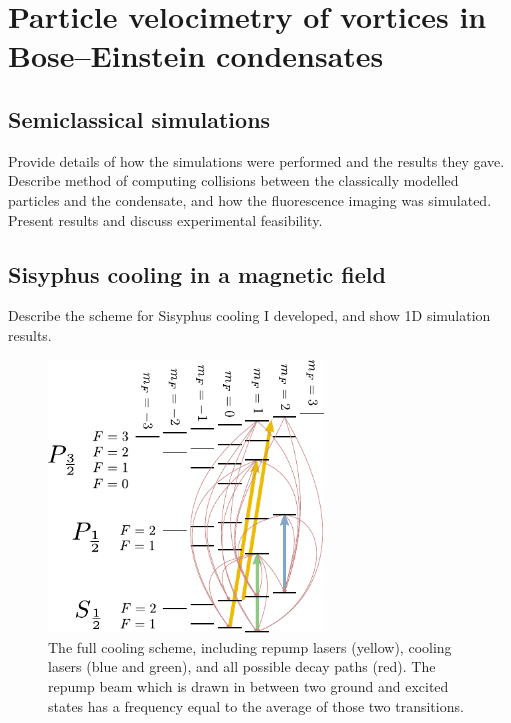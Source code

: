 
\chapter{Particle velocimetry of vortices in Bose–Einstein condensates}

    \section{Semiclassical simulations}
    Provide details of how the simulations were performed and the results they gave. Describe method of computing collisions between the classically modelled particles and the condensate, and how the fluorescence imaging was simulated. Present results and discuss experimental feasibility.

    \section{Sisyphus cooling in a magnetic field}
    Describe the scheme for Sisyphus cooling I developed, and show 1D simulation results.

\begin{figure}
\begin{center}
\includegraphics[width=0.65\textwidth]{figures/cooling_full.pdf}
\caption{\label{fig:cooling_full} The full cooling scheme, including repump lasers (yellow), cooling lasers (blue and green), and all possible decay paths (red). The repump beam which is drawn in between two ground and excited states has a frequency equal to the average of those two transitions. }
\end{center}
\end{figure}


\lipsum[1-5]


